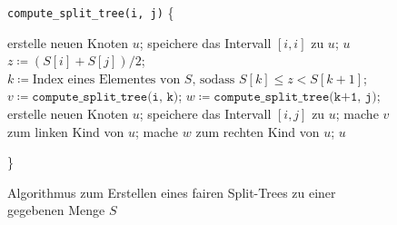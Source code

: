 \begin{figure}
	\centering
	\begin{minipage}{.8\linewidth}
		\scriptsize
		\begin{algorithmic}[H]
			\STATE \texttt{compute\_split\_tree(i, j)}  \{
			\begin{ALC@g}
					\STATE erstelle neuen Knoten $u$;
					\STATE speichere das Intervall $[i,i]$ zu $u$;
					\RETURN $u$
				\ELSE
					\STATE $z \coloneqq (S[i] + S[j]) / 2$;
					\STATE $k \coloneqq \text{Index eines Elementes von } S \text{, sodass } S[k] \leq z < S[k+1]$;
					\STATE $v \coloneqq \texttt{compute\_split\_tree(i, k)}$;
					\STATE $w \coloneqq \texttt{compute\_split\_tree(k+1, j)}$;
					\STATE erstelle neuen Knoten $u$;
					\STATE speichere das Intervall $[i, j]$ zu $u$;
					\STATE mache $v$ zum linken Kind von $u$;
					\STATE mache $w$ zum rechten Kind von $u$;
					\RETURN $u$
				\ENDIF
			\end{ALC@g}
			\STATE \}
		\end{algorithmic}
	\end{minipage}
	\caption{Algorithmus zum Erstellen eines fairen Split-Trees zu einer gegebenen Menge $S$}
	\label{fig:splittree}
\end{figure}

